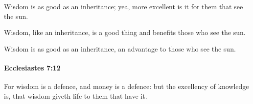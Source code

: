 			\begin{versebox}
					\item[BHS] 
					\item[LXX] 
					\item[ASV] Wisdom is as good as an inheritance; yea, more excellent is it for them that see the sun.
					\item[NIV] Wisdom, like an inheritance, is a good thing and benefits those who see the sun.
					\item[NRSV] Wisdom is as good as an inheritance, an advantage to those who see the sun.
			\end{versebox}

		\paragraph{Ecclesiastes 7:12} %
			\label{ECCLESIASTES-7-12}

			For wisdom is a defence, and money is a defence: but the excellency of knowledge is, that wisdom giveth life to them that have it.

